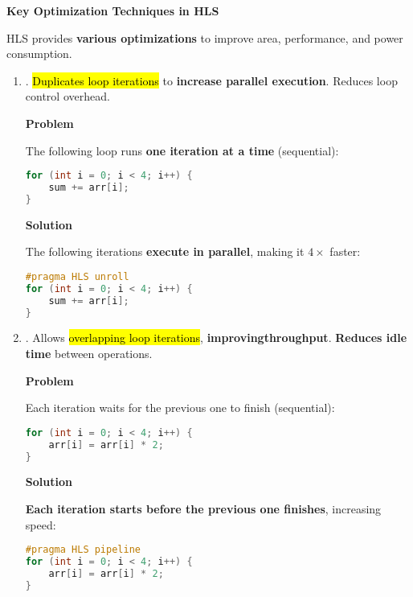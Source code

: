 \highspace
\begin{flushleft}
    \textcolor{Green3}{\faIcon{\speedIcon} \textbf{Key Optimization Techniques in HLS}}
\end{flushleft}
HLS provides \textbf{various optimizations} to improve area, performance, and power consumption.
\begin{enumerate}
    \item {}. \hl{Duplicates loop iterations} to \textbf{increase parallel execution}. Reduces loop control overhead.  
    \begin{flushleft}
        \textcolor{Red2}{ \textbf{Problem}}
    \end{flushleft}
    The following loop runs \textbf{one iteration at a time} (sequential):
    \begin{lstlisting}[language=c++]
for (int i = 0; i < 4; i++) {
    sum += arr[i];
}\end{lstlisting}
    
    \begin{flushleft}
        \textcolor{Green3}{ \textbf{Solution}}
    \end{flushleft}
    The following iterations \textbf{execute in parallel}, making it $4\times$ faster:
    \begin{lstlisting}[language=c++]
#pragma HLS unroll
for (int i = 0; i < 4; i++) {
    sum += arr[i];
}\end{lstlisting}


    \item {}. Allows \hl{overlapping loop iterations}, \textbf{improving}\break \textbf{throughput}. \textbf{Reduces idle time} between operations.
    \begin{flushleft}
        \textcolor{Red2}{ \textbf{Problem}}
    \end{flushleft}
    Each iteration waits for the previous one to finish (sequential):
    \begin{lstlisting}[language=c++]
for (int i = 0; i < 4; i++) {
    arr[i] = arr[i] * 2;
}\end{lstlisting}
    
    \begin{flushleft}
        \textcolor{Green3}{ \textbf{Solution}}
    \end{flushleft}
    \textbf{Each iteration starts before the previous one finishes}, increasing speed:
    \begin{lstlisting}[language=c++]
#pragma HLS pipeline
for (int i = 0; i < 4; i++) {
    arr[i] = arr[i] * 2;
}\end{lstlisting}



\end{enumerate}
